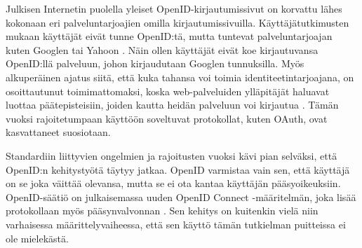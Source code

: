 Julkisen Internetin puolella yleiset OpenID-kir\-jau\-tu\-mis\-si\-vut on korvattu lähes kokonaan eri palveluntarjoajien omilla kirjautumissivuilla. Käyttäjätutkimusten mukaan käyttäjät eivät tunne OpenID:tä, mutta tuntevat palveluntarjoajan kuten Googlen tai Yahoon \cite{refuse_sso}. Näin ollen käyttäjät eivät koe kirjautuvansa OpenID:llä palveluun, johon kirjaudutaan Googlen tunnuksilla. Myös alkuperäinen ajatus siitä, että kuka tahansa voi toimia identiteetintarjoajana, on osoittautunut toimimattomaksi, koska web-palveluiden ylläpitäjät haluavat luottaa päätepisteisiin, joiden kautta heidän palveluun voi kirjautua \cite{refuse_sso}. Tämän vuoksi rajoitetumpaan käyttöön soveltuvat protokollat, kuten OAuth, ovat kasvattaneet suosiotaan.

Standardiin liittyvien ongelmien ja rajoitusten vuoksi kävi pian selväksi, että OpenID:n kehitystyötä täytyy jatkaa. OpenID varmistaa vain sen, että käyttäjä on se joka väittää olevansa, mutta se ei ota kantaa käyttäjän pääsyoikeuksiin. OpenID-säätiö on julkaisemassa uuden OpenID Connect -määritelmän, joka lisää protokollaan myös pääsynvalvonnan \cite{distributed_web_security}. Sen kehitys on kuitenkin vielä niin varhaisessa määrittelyvaiheessa, että sen käyttö tämän tutkielman puitteissa ei ole mielekästä.
